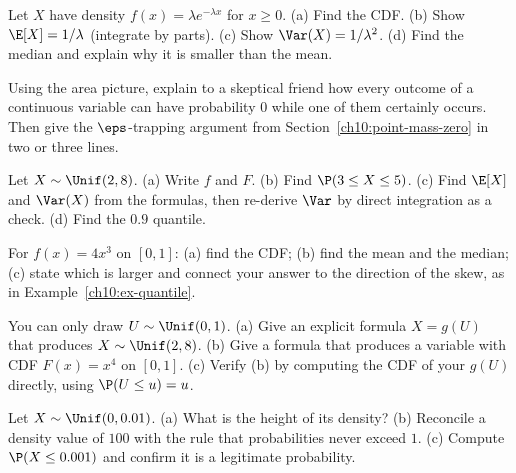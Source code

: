 \begin{exercise}
\label{ch10:exr-expo}
Let $X$ have density $f(x) = \lambda e^{-\lambda x}$ for $x \ge 0$. (a) Find the CDF.
(b) Show $\E[X] = 1/\lambda$ (integrate by parts). (c) Show $\Var(X)=1/\lambda^2$.
(d) Find the median and explain why it is smaller than the mean.
\end{exercise}

\begin{exercise}[Why $\P(X=x)=0$ in your own words]
\label{ch10:exr-pointmass}
Using the area picture, explain to a skeptical friend how every outcome of a
continuous variable can have probability $0$ while one of them certainly occurs.
Then give the $\eps$-trapping argument from Section~\ref{ch10:point-mass-zero} in two
or three lines.
\end{exercise}

\begin{exercise}
\label{ch10:exr-unif}
Let $X \sim \Unif(2,8)$. (a) Write $f$ and $F$. (b) Find $\P(3 \le X \le 5)$.
(c) Find $\E[X]$ and $\Var(X)$ from the formulas, then re-derive $\Var$ by direct
integration as a check. (d) Find the $0.9$ quantile.
\end{exercise}

\begin{exercise}
\label{ch10:exr-skew}
For $f(x)=4x^3$ on $[0,1]$: (a) find the CDF; (b) find the mean and the median;
(c) state which is larger and connect your answer to the direction of the skew, as
in Example~\ref{ch10:ex-quantile}.
\end{exercise}

\begin{exercise}
\label{ch10:exr-pit}
You can only draw $U \sim \Unif(0,1)$. (a) Give an explicit formula $X=g(U)$ that
produces $X \sim \Unif(2,8)$. (b) Give a formula that produces a variable with CDF
$F(x)=x^4$ on $[0,1]$. (c) Verify (b) by computing the CDF of your $g(U)$ directly,
using $\P(U\le u)=u$.
\end{exercise}

\begin{exercise}
\label{ch10:exr-bignum}
Let $X \sim \Unif(0, 0.01)$. (a) What is the height of its density? (b) Reconcile a
density value of $100$ with the rule that probabilities never exceed $1$.
(c) Compute $\P(X \le 0.001)$ and confirm it is a legitimate probability.
\end{exercise}


